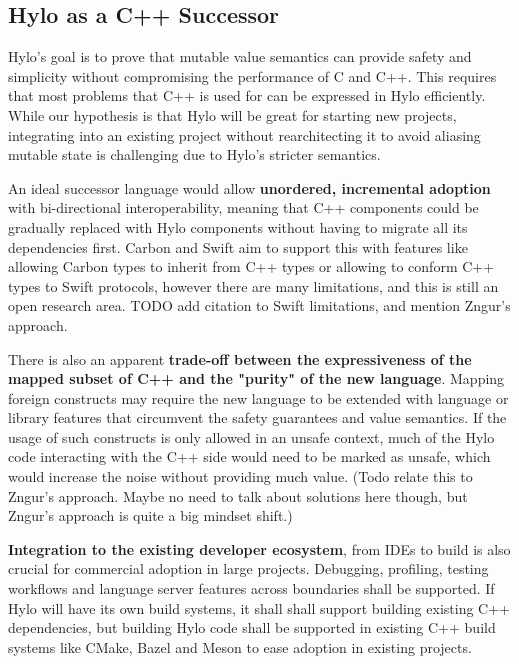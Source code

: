 \subsection{Hylo as a C++ Successor}
Hylo's goal is to prove that mutable value semantics can provide safety and simplicity without compromising the performance of C and C++\cite{hylo-lang}. This requires that most problems that C++ is used for can be expressed in Hylo efficiently. While our hypothesis is that Hylo will be great for starting new projects, integrating into an existing project without rearchitecting it to avoid aliasing mutable state is challenging  due to Hylo's stricter semantics.

An ideal successor language would allow \textbf{unordered, incremental adoption} with bi-directional interoperability\cite{requirements-for-cpp-successor-languages}, meaning that C++ components could be gradually replaced with Hylo components without having to migrate all its dependencies first. Carbon and Swift aim to support this with features like allowing Carbon types to inherit from C++ types\cite{carbon-interop-goals} or allowing to conform C++ types to Swift protocols\cite{swift-cpp-posthoc-conformance}, however there are many limitations, and this is still an open research area. TODO add citation to Swift limitations, and mention Zngur's approach.

There is also an apparent \textbf{trade-off between the expressiveness of the mapped subset of C++ and the "purity" of the new language}. Mapping foreign constructs may require the new language to be extended with language or library features that circumvent the safety guarantees and value semantics. If the usage of such constructs is only allowed in an unsafe context, much of the Hylo code interacting with the C++ side would need to be marked as unsafe, which would increase the noise without providing much value. (Todo relate this to Zngur's approach. Maybe no need to talk about solutions here though, but Zngur's approach is quite a big mindset shift.)

\textbf{Integration to the existing developer ecosystem}, from IDEs to build is also crucial for commercial adoption in large projects. Debugging, profiling, testing workflows and language server features across boundaries shall be supported.\cite{requirements-for-cpp-successor-languages} If Hylo will have its own build systems, it shall shall support building existing C++ dependencies, but building Hylo code shall be supported in existing C++ build systems like CMake, Bazel and Meson to ease adoption in existing projects.

